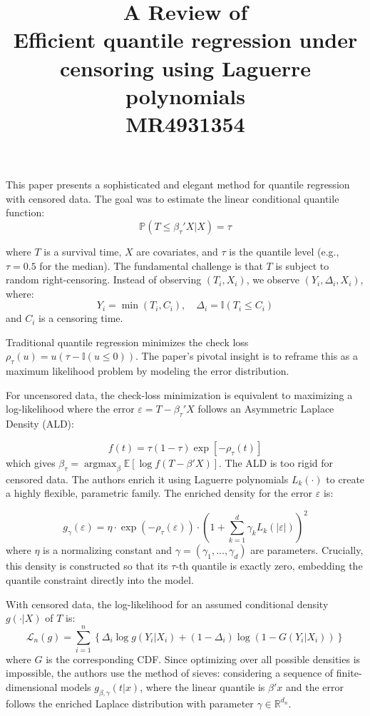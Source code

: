 \documentclass[11pt]{article}
\title{A Review of \\Efficient quantile regression under censoring
	using Laguerre polynomials \\ MR4931354}
\begin{document}
	\maketitle	
	
This paper presents a sophisticated and elegant method for quantile regression with censored data. The goal was to estimate the linear conditional quantile function:
$$
\mathbb{P}(T \leq \beta_{\tau}'X | X) = \tau 
$$

where $T$ is a survival time, $X$ are covariates, and $\tau$ is the quantile level (e.g., $\tau = 0.5$ for the median). The fundamental challenge is that $T$ is subject to random right-censoring. Instead of observing $(T_i, X_i)$, we observe $(Y_i, \Delta_i, X_i)$, where:
$$ 
Y_i = \min(T_i, C_i), \quad \Delta_i = \mathbb{I}(T_i \leq C_i) 
$$
and $C_i$ is a censoring time.

Traditional quantile regression minimizes the check loss $\rho_{\tau}(u)=u(\tau - \mathbb{I}(u \leq 0))$. The paper's pivotal insight is to reframe this as a maximum likelihood problem by modeling the error distribution. 

For uncensored data, the check-loss minimization is equivalent to maximizing a log-likelihood where the error $\varepsilon = T - \beta_{\tau}'X$ follows an Asymmetric Laplace Density (ALD):

$$ 
f(t) = \tau(1-\tau)\exp[-\rho_{\tau}(t)] 
$$
which gives $\beta_{\tau} = \operatorname{argmax}_{\beta} \mathbb{E}[\log f(T - \beta'X)]$. The ALD is too rigid for censored data. The authors enrich it using Laguerre polynomials $L_k(\cdot)$ to create a highly flexible, parametric family. The enriched density for the error $\varepsilon$ is:

$$ 
g_{\gamma}(\varepsilon) = \eta \cdot \exp(-\rho_{\tau}(\varepsilon)) \cdot \left(1 + \sum_{k=1}^{d} \gamma_k L_k(|\varepsilon|)\right)^2 
$$
where $\eta$ is a normalizing constant and $\gamma = (\gamma_1, ..., \gamma_d)$ are parameters. Crucially, this density is constructed so that its $\tau$-th quantile is exactly zero, embedding the quantile constraint directly into the model.

With censored data, the log-likelihood for an assumed conditional density $g(\cdot|X)$ of $T$ is:
$$ \mathcal{L}_n(g) = \sum_{i=1}^{n} \left\{ \Delta_i \log g(Y_i|X_i) + (1-\Delta_i) \log\left(1 - G(Y_i|X_i)\right) \right\} $$
where $G$ is the corresponding CDF. Since optimizing over all possible densities is impossible, the authors use the method of sieves: considering a sequence of finite-dimensional models $g_{\beta, \gamma}(t|x)$, where the linear quantile is $\beta'x$ and the error follows the enriched Laplace distribution with parameter $\gamma \in \mathbb{R}^{d_n}$.
\end{document}
